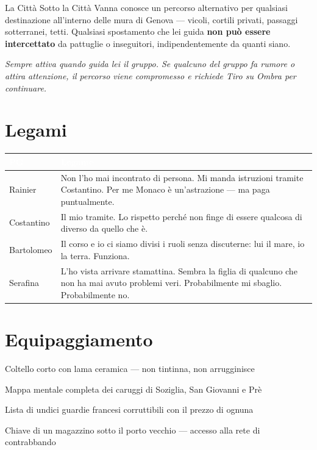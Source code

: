 
\begin{grimaldibox}{La Città Sotto la Città}
  Vanna conosce un percorso alternativo per qualsiasi destinazione
  all'interno delle mura di Genova — vicoli, cortili privati, passaggi
  sotterranei, tetti. Qualsiasi spostamento che lei guida \textbf{non può
  essere intercettato} da pattuglie o inseguitori, indipendentemente da
  quanti siano.

  \medskip\noindent\textit{Sempre attiva quando guida lei il gruppo.
  Se qualcuno del gruppo fa rumore o attira attenzione, il percorso
  viene compromesso e richiede Tiro su Ombra per continuare.}
\end{grimaldibox}

\section*{Legami}

\begin{table}[h]
\centering\renewcommand{\arraystretch}{1.4}
\begin{tabularx}{\linewidth}{@{}L{2.6cm} X@{}}
  \toprule{}
  \textcolor{white}{\textbf{PG}} & \textcolor{white}{\textbf{Legame}} \\
  \midrule
  Rainier & Non l'ho mai incontrato di persona. Mi manda istruzioni tramite
           Costantino. Per me Monaco è un'astrazione — ma paga puntualmente. \\
  Costantino & Il mio tramite. Lo rispetto perché non finge di essere
              qualcosa di diverso da quello che è. \\
  Bartolomeo & Il corso e io ci siamo divisi i ruoli senza discuterne:
              lui il mare, io la terra. Funziona. \\
  Serafina & L'ho vista arrivare stamattina. Sembra la figlia di qualcuno
            che non ha mai avuto problemi veri. Probabilmente mi sbaglio.
            Probabilmente no. \\
  \bottomrule
\end{tabularx}
\end{table}

\section*{Equipaggiamento}
\begin{goldlist}
  \item Coltello corto con lama ceramica — non tintinna, non arrugginisce
  \item Mappa mentale completa dei caruggi di Soziglia, San Giovanni e Prè
  \item Lista di undici guardie francesi corruttibili con il prezzo di ognuna
  \item Chiave di un magazzino sotto il porto vecchio — accesso alla rete di contrabbando
\end{goldlist}

